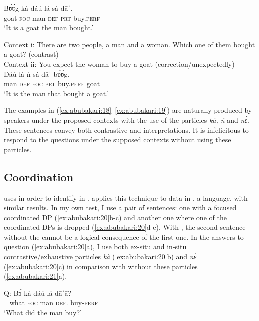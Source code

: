 \documentclass[output=paper,modfonts,nonflat,
 hidelinks
]{langsci/langscibook}
\begin{document}
\ex\label{ex:abubakari:18b}
\gll Bʋ́ʋ́g  kà  dáú  lá  sá  dāˈ. \\        goat  \textsc{foc}  man  \textsc{def}  \textsc{prt}  buy.\textsc{perf} \\
\glt ‘It is a goat the man bought.’
\z
\z

\ea\label{ex:abubakari:19} 
Context i: There are two people, a man and a woman.       Which one of them bought a goat? (contrast)\\
 
Context ii: You expect the woman to buy a goat    
	(correction/unexpectedly)\\

\ea\label{ex:abubakari:19a} 
\gll Dáú  lá  ń  sá  dāˈ    bʋ́ʋ́g.\\
man    \textsc{def}  \textsc{foc}  \textsc{prt}  buy.\textsc{perf}  goat\\
\glt ‘It is the    man   that bought a goat.’
\z
\z 

The examples in (\ref{ex:abubakari:18}--\ref{ex:abubakari:19}) are naturally produced by speakers under the proposed contexts with the use of the particles \textit{kà, ń} and \textit{nɛ́}. These sentences convey both contrastive and  interpretations. It is infelicitous to respond to the questions under the supposed contexts without using these particles.
 

\subsection{Coordination}

 
\citet{szabolcsi1981} uses  in order to identify  in . \citet{duah2015} applies this technique to data in , a  language, with similar results. In my own test, I use a pair of sentences: one with a focused coordinated DP (\ref{ex:abubakari:20}b-c) and another one where one of the coordinated DPs is dropped (\ref{ex:abubakari:20}d-e). With , the second sentence without the  cannot be a logical consequence of the first one. In the answers to question (\ref{ex:abubakari:20}a), I use both ex-situ and in-situ contrastive{\slash}exhaustive particles \textit{kà} (\ref{ex:abubakari:20}b) and \textit{nɛ́} (\ref{ex:abubakari:20}c) in comparison with  without these particles (\ref{ex:abubakari:21}a).
 

 
\ea\label{ex:abubakari:20}
\ea\label{ex:abubakari:20a}
\gll Q: Bɔ́  kà  dáú  lá  dāˈā?\\                  
  ~     what  \textsc{foc}  man  \textsc{def}.  buy-\textsc{perf}   \\
\glt ‘What did the man buy?’
\end{document}
